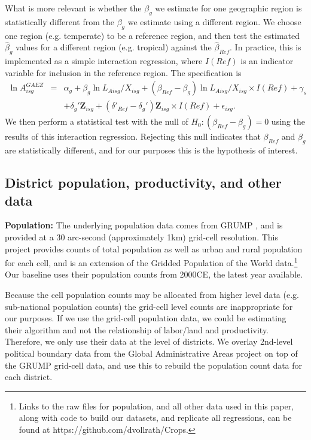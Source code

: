\documentclass[11pt]{article}
\begin{document}
What is more relevant is whether the $\beta_g$ we estimate for one geographic region is statistically different from the $\beta_g$ we estimate using a different region. We choose one region (e.g. temperate) to be a reference region, and then test the estimated $\hat{\beta}_g$ values for a different region (e.g. tropical) against the $\hat{\beta}_{Ref}$. In practice, this is implemented as a simple interaction regression, where $I(Ref)$ is an indicator variable for inclusion in the reference region. The specification is
\begin{eqnarray}
    \ln A^{GAEZ}_{isg} &=& \alpha_g + \beta_g \ln L_{Aisg}/X_{isg} + (\beta_{Ref} - \beta_g) \ln L_{Aisg}/X_{isg} \times I(Ref) + \gamma_{s} \\ \nonumber
     && + \delta_g' \mathbf{Z}_{isg} + (\delta'_{Ref} - \delta_g') \mathbf{Z}_{isg} \times I(Ref) + \epsilon_{isg}. \label{EQ_interaction}
\end{eqnarray}
We then perform a statistical test with the null of $H_0: (\beta_{Ref} - \beta_g) = 0$ using the results of this interaction regression. Rejecting this null indicates that $\beta_{Ref}$ and $\beta_g$ are statistically different, and for our purposes this is the hypothesis of interest.

\subsection{District population, productivity, and other data}

\noindent\textbf{Population:} The underlying population data comes from GRUMP \citep{grump2011}, and is provided at a 30 arc-second (approximately 1km) grid-cell resolution. This project provides counts of total population as well as urban and rural population for each cell, and is an extension of the Gridded Population of the World data.\footnote{Links to the raw files for population, and all other data used in this paper, along with code to build our datasets, and replicate all regressions, can be found at https://github.com/dvollrath/Crops.} Our baseline uses their population counts from 2000CE, the latest year available.

Because the cell population counts may be allocated from higher level data (e.g. sub-national population counts) the grid-cell level counts are inappropriate for our purposes. If we use the grid-cell population data, we could be estimating their algorithm and not the relationship of labor/land and productivity. Therefore, we only use their data at the level of districts. We overlay 2nd-level political boundary data from the Global Administrative Areas project \citep{gadm} on top of the GRUMP grid-cell data, and use this to rebuild the population count data for each district.
\end{document}
